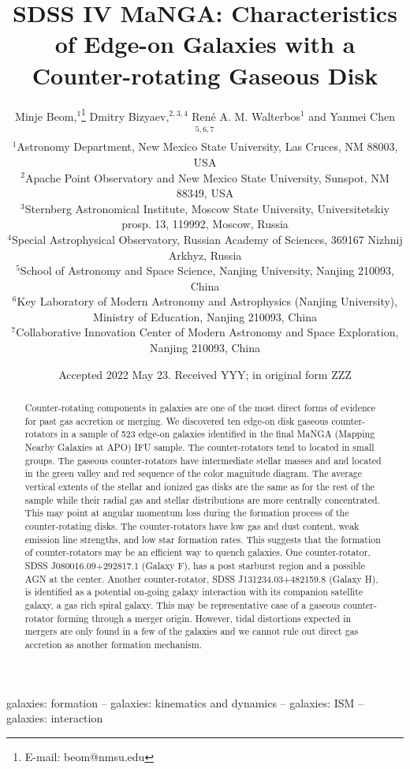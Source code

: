 \documentclass[fleqn,usenatbib]{mnras}
\title[Characteristics of Edge-on Gaseous Counter-rotating Galaxies]{SDSS IV MaNGA: Characteristics of Edge-on Galaxies with 
a Counter-rotating Gaseous Disk}
\author[Minje Beom et al.]{
Minje Beom,$^{1}$\thanks{E-mail: beom@nmsu.edu}
Dmitry Bizyaev,$^{2,3,4}$
Ren\'e A. M. Walterbos$^{1}$
and Yanmei Chen$^{5,6,7}$
\\
$^{1}$Astronomy Department, New Mexico State University, Las Cruces, NM 88003, USA\\
$^{2}$Apache Point Observatory and New Mexico State University, Sunspot, NM 88349, USA\\
$^{3}$Sternberg Astronomical Institute, Moscow State University, Universitetskiy prosp. 13, 119992, Moscow, Russia\\
$^{4}$Special Astrophysical Observatory, Russian Academy of Sciences, 369167 Nizhnij Arkhyz, Russia\\
$^{5}$School of Astronomy and Space Science, Nanjing University, Nanjing 210093, China\\
$^{6}$Key Laboratory of Modern Astronomy and Astrophysics (Nanjing University), Ministry of Education, Nanjing 210093, China\\
$^{7}$Collaborative Innovation Center of Modern Astronomy and Space Exploration, Nanjing 210093, China
}
\date{Accepted 2022 May 23. Received YYY; in original form ZZZ}
\begin{document}
\label{firstpage}
\pagerange{\pageref{firstpage}--\pageref{lastpage}}
\maketitle

\begin{abstract}
Counter-rotating components in galaxies are one of the most direct
forms of evidence for past gas accretion or merging.
We discovered ten edge-on disk gaseous counter-rotators in 
a sample of 523 edge-on galaxies identified in the final MaNGA 
(Mapping Nearby Galaxies at APO) IFU sample. The counter-rotators tend to located in small groups.
The gaseous counter-rotators have intermediate stellar masses and
and located in the green valley and red sequence of the color magnitude diagram. 
The average vertical extents of the stellar and ionized gas disks are the same as for the rest of the sample
while their radial gas and stellar distributions are more centrally concentrated.
This may point at angular momentum loss 
during the formation process of the counter-rotating disks.
The counter-rotators have low gas and dust content, weak emission line strengths, 
and low star formation rates.
This suggests that the formation of counter-rotators 
may be an efficient way to quench galaxies. 
One counter-rotator, SDSS
J080016.09+292817.1 (Galaxy F), has a post starburst region and a possible
AGN at the center.
Another counter-rotator, SDSS J131234.03+482159.8 (Galaxy H), is identified as a potential on-going galaxy interaction 
with its companion satellite galaxy, a gas rich spiral galaxy. 
This may be representative case of  
a gaseous counter-rotator forming through a merger origin. However, tidal distortions expected in mergers are only found in a few of the galaxies and we cannot rule out direct gas accretion as another formation mechanism.
\end{abstract}

\begin{keywords}
galaxies: formation -- galaxies: kinematics and dynamics -- galaxies: ISM -- galaxies: interaction
\end{keywords}


\end{document}

